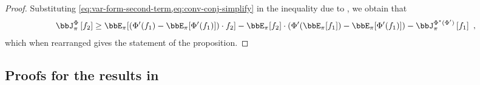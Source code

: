 \documentclass[11pt]{article}
\newcounter{ct}
\newcommand{\Phient}[3]{
    \ensuremath{\if$#3$\bbJ_{#1}^{#2}\else\bbJ_{#1}^{#2}\left[#3\right]\fi}}
\begin{document}
\begin{proof}
Substituting \cref{eq:var-form-second-term,eq:conv-conj-simplify} in the inequality due to \citeauthor{chafai2004entropies}, we obtain that
\begin{equation*}
    \Phient{\pi}{\Phi}{f_{2}} \geq \bbE_{\pi}[(\Phi'(f_{1}) - \bbE_{\pi}[\Phi'(f_{1})]) \cdot f_{2}] -  \bbE_{\pi}[f_{2}] \cdot (\Phi'(\bbE_{\pi}[f_{1}]) - \bbE_{\pi}[\Phi'(f_{1})]) - \Phient{\pi}{\Phi^{\star}(\Phi')}{f_{1}}~,
\end{equation*}
which when rearranged gives the statement of the proposition.
\end{proof}

\subsection{Proofs for the results in }
\end{document}
